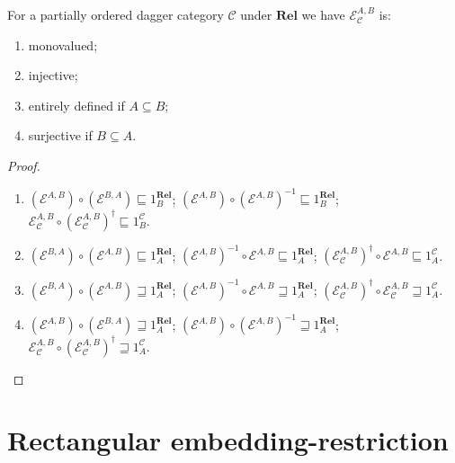 \begin{prop}
  For a partially ordered dagger category $\mathcal{C}$ under
  $\mathbf{Rel}$ we have $\mathcal{E}_{\mathcal{C}}^{A,B}$ is:
  \begin{enumerate}
    \item monovalued;
    
    \item injective;
    
    \item entirely defined if $A \subseteq B$;
    
    \item surjective if $B \subseteq A$.
  \end{enumerate}
\end{prop}

\begin{proof}
  ~
  \begin{enumerate}
    \item $(\mathcal{E}^{A,B}) \circ (\mathcal{E}^{B,A}) \sqsubseteq
    1^{\mathbf{Rel}}_B$; $(\mathcal{E}^{A,B}) \circ (\mathcal{E}^{A,B})^{- 1} \sqsubseteq 1^{\mathbf{Rel}}_B$;
    $\mathcal{E}_{\mathcal{C}}^{A,B} \circ (\mathcal{E}_{\mathcal{C}}^{A,B})^{\dagger} \sqsubseteq 1^{\mathcal{C}}_B$.
    
    \item $(\mathcal{E}^{B,A}) \circ (\mathcal{E}^{A,B}) \sqsubseteq
    1^{\mathbf{Rel}}_A$; $(\mathcal{E}^{A,B})^{- 1} \circ \mathcal{E}^{A,B} \sqsubseteq 1^{\mathbf{Rel}}_A$;
    $(\mathcal{E}_{\mathcal{C}}^{A,B})^{\dagger} \circ \mathcal{E}^{A,B} \sqsubseteq 1^{\mathcal{C}}_A$.
    
    \item $(\mathcal{E}^{B,A}) \circ (\mathcal{E}^{A,B}) \sqsupseteq
    1^{\mathbf{Rel}}_A$; $(\mathcal{E}^{A,B})^{- 1} \circ \mathcal{E}^{A,B} \sqsupseteq 1^{\mathbf{Rel}}_A$;
    $(\mathcal{E}_{\mathcal{C}}^{A,B})^{\dagger} \circ \mathcal{E}_{\mathcal{C}}^{A,B} \sqsupseteq 1^{\mathcal{C}}_A$.
    
    \item $(\mathcal{E}^{A,B}) \circ (\mathcal{E}^{B,A}) \sqsupseteq
    1^{\mathbf{Rel}}_A$; $(\mathcal{E}^{A,B}) \circ (\mathcal{E}^{A,B})^{- 1} \sqsupseteq 1^{\mathbf{Rel}}_A$;
    $\mathcal{E}_{\mathcal{C}}^{A,B} \circ (\mathcal{E}_{\mathcal{C}}^{A,B})^{\dagger} \sqsupseteq 1^{\mathcal{C}}_A$.
  \end{enumerate}
\end{proof}

\section{Rectangular embedding-restriction}

